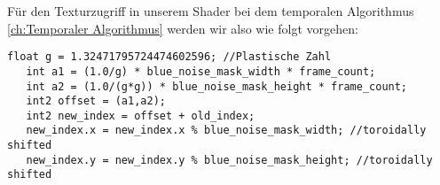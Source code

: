 Für den Texturzugriff in unserem Shader bei dem temporalen Algorithmus \ref{ch:Temporaler Algorithmus}
werden wir also wie folgt vorgehen:

\begin{lstlisting}[style=CStyle]
   float g = 1.32471795724474602596; //Plastische Zahl
   int a1 = (1.0/g) * blue_noise_mask_width * frame_count;
   int a2 = (1.0/(g*g)) * blue_noise_mask_height * frame_count;
   int2 offset = (a1,a2);
   int2 new_index = offset + old_index;
   new_index.x = new_index.x % blue_noise_mask_width; //toroidally shifted
   new_index.y = new_index.y % blue_noise_mask_height; //toroidally shifted
\end{lstlisting}
